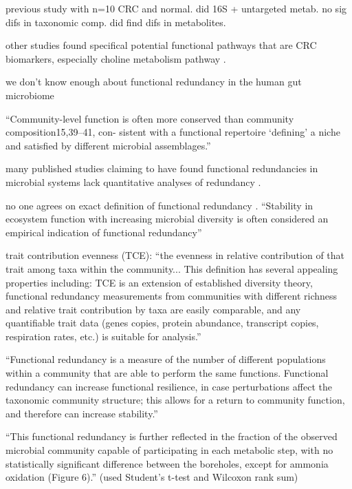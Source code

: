 \documentclass[11pt]{article}
\begin{document}
previous study with n=10 CRC and normal. did 16S + untargeted metab. no sig difs in taxonomic comp. did find difs in metabolites. \cite{weir_stool_2013}

other studies found specifical potential functional pathways that are CRC biomarkers, especially choline metabolism pathway \cite{thomas_metagenomic_2019}.


we don't know enough about functional redundancy in the human gut microbiome \cite{heintz-buschart_human_2018}

``Community-level function is often more conserved than community composition15,39–41, con- sistent with a functional repertoire ‘defining’ a niche and satisfied by different microbial assemblages.'' \cite{franzosa_species-level_2018}

many published studies claiming to have found functional redundancies in microbial systems lack quantitative analyses of redundancy \cite{souza_metagenomic_2015, ferrer_microbiota_2013}.

no one agrees on exact definition of functional redundancy \cite{louca_function_2018, heintz-buschart_human_2018, tully_dynamic_2018, royalty_quantitative_2020}.
``Stability in ecosystem function with increasing microbial diversity is often considered an empirical indication of functional redundancy''
\cite{royalty_quantitative_2020}


trait contribution evenness (TCE): ``the evenness in relative contribution of that trait among taxa within the community... This definition has several appealing properties including: TCE is an extension of established diversity theory, functional redundancy measurements from communities with different richness and relative trait contribution by taxa are easily comparable, and any quantifiable trait data (genes copies, protein abundance, transcript copies, respiration rates, etc.) is suitable for analysis.'' \cite{royalty_quantitative_2020}

``Functional redundancy is a measure of the number of different populations within a community that are able to perform the same functions. Functional redundancy can increase functional resilience, in case perturbations affect the taxonomic community structure; this allows for a return to community function, and therefore can increase stability.'' \cite{heintz-buschart_human_2018}

``This functional redundancy is further reflected in the fraction of the observed microbial community capable of participating in each metabolic step, with no statistically significant difference between the boreholes, except for ammonia oxidation (Figure 6).'' (used Student's t-test and Wilcoxon rank sum) \cite{tully_dynamic_2018}
\end{document}
